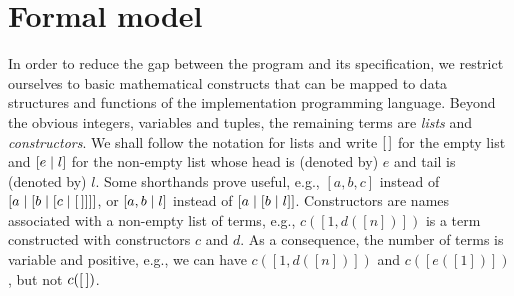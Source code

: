 
\section{Formal model}
\label{model}

In order to reduce the gap between the program and its specification,
we restrict ourselves to basic mathematical constructs that can be
mapped to data structures and functions of the implementation
programming language. Beyond the obvious integers, variables and
tuples, the remaining terms are \emph{lists} and \emph{constructors}.
We shall follow the \Prolog notation for lists and write \([\,]\) for
the empty list and \([{e}\mid{l}]\) for the non\hyp{}empty list whose
head is (denoted by) \(e\) and tail is (denoted by) \(l\). Some
shorthands prove useful, e.g., \([a,b,c]\) instead of
\([{a}\mid{[{b}\mid{[{c}\mid{[\,]}]}]}]\), or \([{a,b}\mid{l}]\) instead of
\([{a}\mid{[{b}\mid{l}]}]\). Constructors are names associated with a
non\hyp{}empty list of terms, e.g., \(c([1,d([n])])\) is a term
constructed with constructors \(c\) and \(d\). As a consequence, the
number of terms is variable and positive, e.g., we can have
\(c([1,d([n])])\) and \(c([e([1])])\), but not \(c([\,])\).

